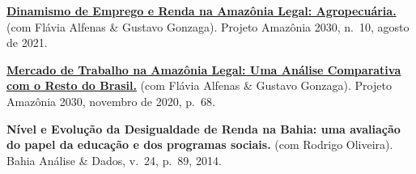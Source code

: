 \documentclass[a4paper,9pt]{article}
\newcommand{\cvgap}{\vspace{2mm}}
\begin{document}
\begin{flushleft}
\cvgap

\textbf{\href{https://amazonia2030.org.br/dinamismo-de-emprego-e-renda-na-amazonia-legal-agropecuaria/}{Dinamismo de Emprego e Renda na Amazônia Legal: Agropecuária.}} (com Flávia Alfenas \& Gustavo Gonzaga). Projeto Amazônia 2030, n.~10, agosto de 2021.

\cvgap

\textbf{\href{https://amazonia2030.org.br/mercado-de-trabalho-na-amazonia-legal-uma-analise-comparativa-com-o-resto-do-brasil/}{Mercado de Trabalho na Amazônia Legal: Uma Análise Comparativa com o Resto do Brasil.}} (com Flávia Alfenas \& Gustavo Gonzaga). Projeto Amazônia 2030, novembro de 2020, p.~68.

\cvgap

\textbf{Nível e Evolução da Desigualdade de Renda na Bahia: uma avaliação do papel da educação e dos programas sociais.} (com Rodrigo Oliveira). Bahia Análise \& Dados, v.~24, p.~89, 2014.

\end{flushleft}
\end{document}

